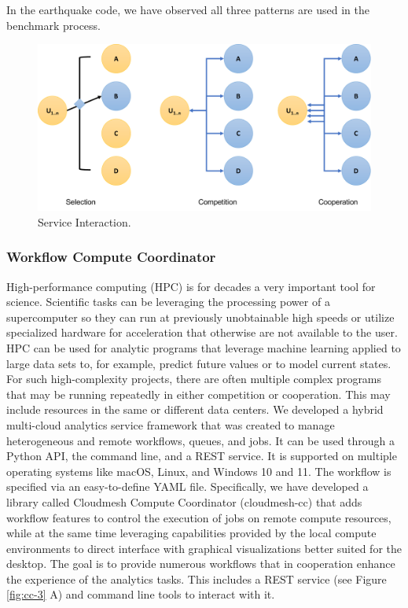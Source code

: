 \documentclass[utf8]{FrontiersinVancouver} %
\begin{document}
{In the earthquake code, we have observed all three patterns are used
in the benchmark process.

\begin{figure}[htb]
\centering\includegraphics[width=0.75\columnwidth]{images/processes-nist.pdf}
\caption{Service Interaction.}
\label{fig:service-interaction}
\end{figure}




\subsubsection{Workflow Compute Coordinator}
\label{sec:workflow-cc}


High-performance computing (HPC) is for decades a very important tool
for science. Scientific tasks can be leveraging the processing power
of a supercomputer so they can run at previously unobtainable high
speeds or utilize specialized hardware for acceleration that otherwise
are not available to the user. HPC can be used for analytic programs
that leverage machine learning applied to large data sets to, for
example, predict future values or to model current states. For such
high-complexity projects, there are often multiple complex programs
that may be running repeatedly in either competition or cooperation.
This may include resources in the same or different data centers. We
developed a hybrid multi-cloud analytics service framework that was
created to manage heterogeneous and remote workflows, queues, and
jobs.  It can be used through a Python API, the command line, and a
REST service. It is supported on multiple operating systems like
macOS, Linux, and Windows 10 and 11.  The workflow is specified via an
easy-to-define YAML file.  Specifically, we have developed a library
called Cloudmesh Compute Coordinator (cloudmesh-cc)
\citep{las-22-arxiv-workflow-cc} that adds workflow features to
control the execution of jobs on remote compute resources, while at
the same time leveraging capabilities provided by the local compute
environments to direct interface with graphical visualizations better
suited for the desktop. The goal is to provide numerous workflows that
in cooperation enhance the experience of the analytics tasks. This
includes a REST service (see Figure \ref{fig:cc-3} A) and command line
tools to interact with it.


}
\end{document}
